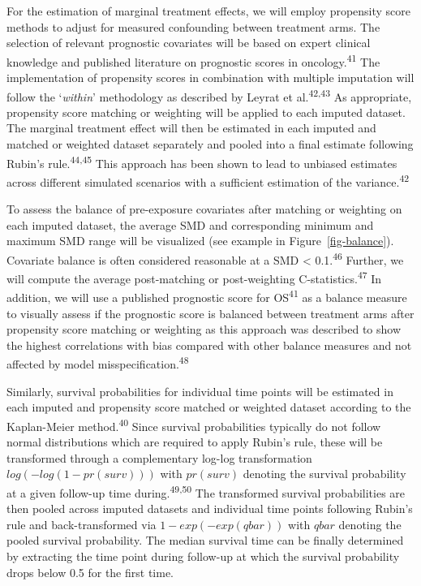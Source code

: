 \documentclass[
  letterpaper,
  DIV=11,
  numbers=noendperiod]{scrartcl}
\begin{document}
For the estimation of marginal treatment effects, we will employ
propensity score methods to adjust for measured confounding between
treatment arms. The selection of relevant prognostic covariates will be
based on expert clinical knowledge and published literature on
prognostic scores in oncology.\textsuperscript{41} The implementation of
propensity scores in combination with multiple imputation will follow
the `\emph{within}' methodology as described by Leyrat et
al.\textsuperscript{42,43} As appropriate, propensity score matching or
weighting will be applied to each imputed dataset. The marginal
treatment effect will then be estimated in each imputed and matched or
weighted dataset separately and pooled into a final estimate following
Rubin's rule.\textsuperscript{44,45} This approach has been shown to
lead to unbiased estimates across different simulated scenarios with a
sufficient estimation of the variance.\textsuperscript{42}

To assess the balance of pre-exposure covariates after matching or
weighting on each imputed dataset, the average SMD and corresponding
minimum and maximum SMD range will be visualized (see example in
Figure~\ref{fig-balance}). Covariate balance is often considered
reasonable at a SMD \textless{} 0.1.\textsuperscript{46} Further, we
will compute the average post-matching or post-weighting
C-statistics.\textsuperscript{47} In addition, we will use a published
prognostic score for OS\textsuperscript{41} as a balance measure to
visually assess if the prognostic score is balanced between treatment
arms after propensity score matching or weighting as this approach was
described to show the highest correlations with bias compared with other
balance measures and not affected by model
misspecification.\textsuperscript{48}

Similarly, survival probabilities for individual time points will be
estimated in each imputed and propensity score matched or weighted
dataset according to the Kaplan-Meier method.\textsuperscript{40} Since
survival probabilities typically do not follow normal distributions
which are required to apply Rubin's rule, these will be transformed
through a complementary log-log transformation \(log(-log(1-pr(surv)))\)
with \(pr(surv)\) denoting the survival probability at a given follow-up
time during.\textsuperscript{49,50} The transformed survival
probabilities are then pooled across imputed datasets and individual
time points following Rubin's rule and back-transformed via
\(1-exp(-exp(qbar))\) with \(qbar\) denoting the pooled survival
probability. The median survival time can be finally determined by
extracting the time point during follow-up at which the survival
probability drops below 0.5 for the first time.
\end{document}
